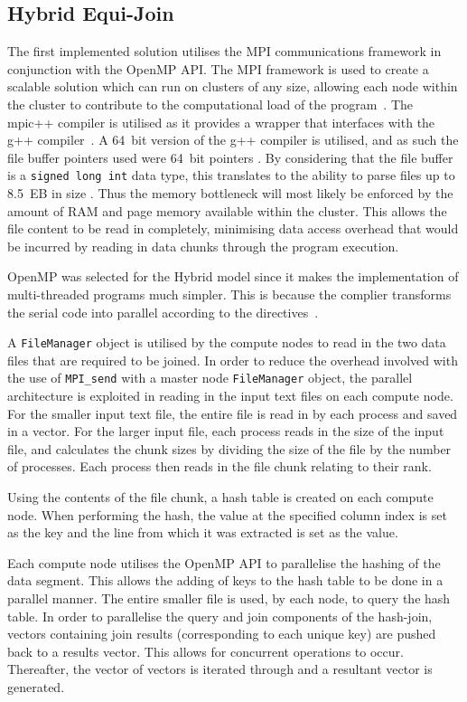 \documentclass[12pt,twocolumn]{witseiepaper}
\begin{document}
\subsection{Hybrid Equi-Join}
The first implemented solution utilises the MPI communications framework in conjunction with the OpenMP API. The MPI framework is used to create a scalable solution which can run on clusters of any size, allowing each node within the cluster to contribute to the computational load of the program~\cite{mpi-scale}. The mpic++ compiler is utilised as it provides a wrapper that interfaces with the g++ compiler~\cite{mpic++-wrapper}. A 64~bit version of the g++ compiler is utilised, and as such the file buffer pointers used were 64~bit pointers \cite{pointer-size}. By considering that the file buffer is a \texttt{signed long int} data type, this translates to the ability to parse files up to 8.5~EB in size \cite{pointer-size}. Thus the memory bottleneck will most likely be enforced by the amount of RAM and page memory available within the cluster. This allows the file content to be read in completely, minimising data access overhead that would be incurred by reading in data chunks through the program execution.

OpenMP was selected for the Hybrid model since it makes the implementation of multi-threaded programs much simpler. This is because the complier transforms the serial code into parallel according to the directives~\cite{comparingMPIMapReduce}.

A \texttt{FileManager} object is utilised by the compute nodes to read in the two data files that are required to be joined. In order to reduce the overhead involved with the use of \texttt{MPI\_send} with a master node \texttt{FileManager} object, the parallel architecture is exploited in reading in the input text files on each compute node. For the smaller input text file, the entire file is read in by each process and saved in a vector. For the larger input file, each process reads in the size of the input file, and calculates the chunk sizes by dividing the size of the file by the number of processes. Each process then reads in the file chunk relating to their rank.

Using the contents of the file chunk, a hash table is created on each compute node. When performing the hash, the value at the specified column index is set as the key and the line from which it was extracted is set as the value.

Each compute node utilises the OpenMP API to parallelise the hashing of the data segment. This allows the adding of keys to the hash table to be done in a parallel manner. The entire smaller file is used, by each node, to query the hash table. In order to parallelise the query and join components of the hash-join, vectors containing join results (corresponding to each unique key) are pushed back to a results vector. This allows for concurrent operations to occur. Thereafter, the vector of vectors is iterated through and a resultant vector is generated.
\end{document}
